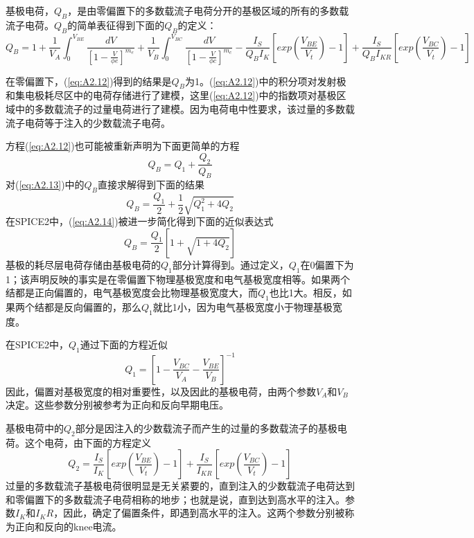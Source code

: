 基极电荷，$Q_B$，是由零偏置下的多数载流子电荷分开的基极区域的所有的多数载流子电荷。$Q_B$\cite{ref-82,ref-83}的简单表征得到下面的$Q_B$的定义：
\begin{equation}
    Q_B = 1 + \frac{1}{V_A}\int^{V_{BE}}_0\frac{dV}{[1-\frac{V}{\phi e}]^{m_e}} + \frac{1}{V_B}\int^{V_{BC}}_0\frac{dV}{[1-\frac{V}{\phi c}]^{m_c}} - \frac{I_S}{Q_BI_K}[exp(\frac{V_{BE}}{V_t})-1] + \frac{I_S}{Q_BI_{KR}}[exp(\frac{V_{BC}}{V_t})-1]
    \label{eq:A2.12}
\end{equation}

在零偏置下，(\ref{eq:A2.12})得到的结果是$Q_B$为1。(\ref{eq:A2.12})中的积分项对发射极和集电极耗尽区中的电荷存储进行了建模，这里(\ref{eq:A2.12})中的指数项对基极区域中的多数载流子的过量电荷进行了建模。因为电荷电中性要求，该过量的多数载流子电荷等于注入的少数载流子电荷。

方程(\ref{eq:A2.12})也可能被重新声明为下面更简单的方程
\begin{equation}
    Q_B = Q_1 + \frac{Q_2}{Q_B}
    \label{eq:A2.13}
\end{equation}
对(\ref{eq:A2.13})中的$Q_B$直接求解得到下面的结果
\begin{equation}
    Q_B = \frac{Q_1}{2} + \frac{1}{2}\sqrt{Q^2_1 + 4Q_2}
    \label{eq:A2.14}
\end{equation}
在SPICE2中，(\ref{eq:A2.14})被进一步简化得到下面的近似表达式
\begin{equation}
    Q_B = \frac{Q_1}{2}[1 + \sqrt{1 + 4Q_2}]
    \label{eq:A2.15}
\end{equation}
基极的耗尽层电荷存储由基极电荷的$Q_1$部分计算得到。通过定义，$Q_1$在0偏置下为1；该声明反映的事实是在零偏置下物理基极宽度和电气基极宽度相等。如果两个结都是正向偏置的，电气基极宽度会比物理基极宽度大，而$Q_1$也比1大。相反，如果两个结都是反向偏置的，那么$Q_1$就比1小，因为电气基极宽度小于物理基极宽度。

在SPICE2中，$Q_1$通过下面的方程近似
\begin{equation}
    Q_1 = [1 - \frac{V_{BC}}{V_A} - \frac{V_{BE}}{V_B}]^{-1}
    \label{eq:A2.16}
\end{equation}
因此，偏置对基极宽度的相对重要性，以及因此的基极电荷，由两个参数$V_A$和$V_B$决定。这些参数分别被参考为正向和反向早期电压。

基极电荷中的$Q_2$部分是因注入的少数载流子而产生的过量的多数载流子的基极电荷。这个电荷，由下面的方程定义
\begin{equation}
    Q_2 = \frac{I_S}{I_K}[exp(\frac{V_{BE}}{V_t})-1] + \frac{I_S}{I_{KR}}[exp(\frac{V_{BC}}{V_t})-1]
    \label{eq:A2.17}
\end{equation}
过量的多数载流子基极电荷很明显是无关紧要的，直到注入的少数载流子电荷达到和零偏置下的多数载流子电荷相称的地步；也就是说，直到达到高水平的注入。参数$I_K$和$I_KR$，因此，确定了偏置条件，即遇到高水平的注入。这两个参数分别被称为正向和反向的knee电流。

